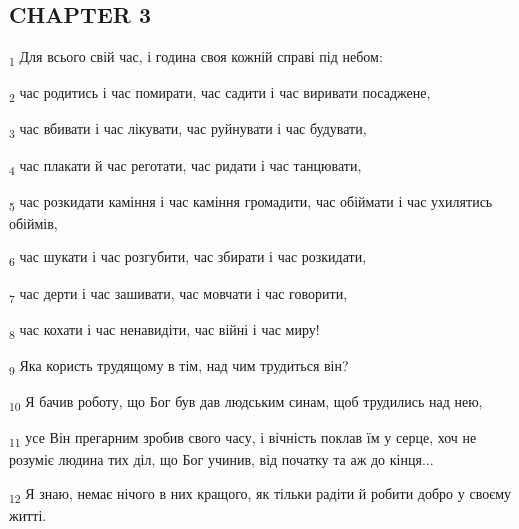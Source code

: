 \subsection{CHAPTER 3}
\begin{tcolorbox}
\textsubscript{1} Для всього свій час, і година своя кожній справі під небом:
\end{tcolorbox}
\begin{tcolorbox}
\textsubscript{2} час родитись і час помирати, час садити і час виривати посаджене,
\end{tcolorbox}
\begin{tcolorbox}
\textsubscript{3} час вбивати і час лікувати, час руйнувати і час будувати,
\end{tcolorbox}
\begin{tcolorbox}
\textsubscript{4} час плакати й час реготати, час ридати і час танцювати,
\end{tcolorbox}
\begin{tcolorbox}
\textsubscript{5} час розкидати каміння і час каміння громадити, час обіймати і час ухилятись обіймів,
\end{tcolorbox}
\begin{tcolorbox}
\textsubscript{6} час шукати і час розгубити, час збирати і час розкидати,
\end{tcolorbox}
\begin{tcolorbox}
\textsubscript{7} час дерти і час зашивати, час мовчати і час говорити,
\end{tcolorbox}
\begin{tcolorbox}
\textsubscript{8} час кохати і час ненавидіти, час війні і час миру!
\end{tcolorbox}
\begin{tcolorbox}
\textsubscript{9} Яка користь трудящому в тім, над чим трудиться він?
\end{tcolorbox}
\begin{tcolorbox}
\textsubscript{10} Я бачив роботу, що Бог був дав людським синам, щоб трудились над нею,
\end{tcolorbox}
\begin{tcolorbox}
\textsubscript{11} усе Він прегарним зробив свого часу, і вічність поклав їм у серце, хоч не розуміє людина тих діл, що Бог учинив, від початку та аж до кінця...
\end{tcolorbox}
\begin{tcolorbox}
\textsubscript{12} Я знаю, немає нічого в них кращого, як тільки радіти й робити добро у своєму житті.
\end{tcolorbox}
